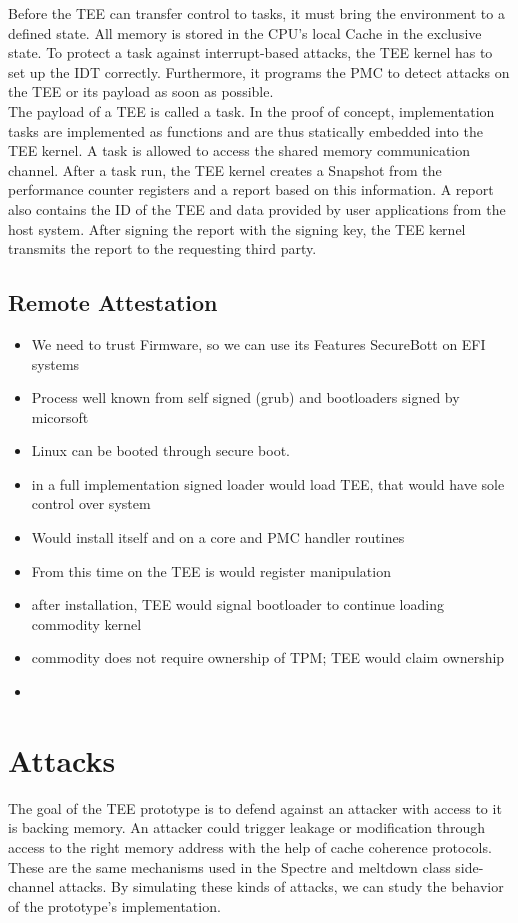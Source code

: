 Before the TEE can transfer control to tasks, it must bring the environment to a
defined state. All memory is stored in the CPU's local Cache in the exclusive
state. To protect a task against interrupt-based attacks, the TEE kernel has to
set up the IDT correctly. Furthermore, it programs the PMC to detect attacks on
the TEE or its payload as soon as possible. \\

The payload of a TEE is called a task. In the proof of concept, implementation
tasks are implemented as functions and are thus statically embedded into the TEE
kernel. A task is allowed to access the shared memory communication channel.
After a task run, the TEE kernel creates a Snapshot from the performance counter
registers and a report based on this information. A report also contains the ID
of the TEE and data provided by user applications from the host system. After
signing the report with the signing key, the TEE kernel transmits the report to
the requesting third party.

\subsection{Remote Attestation}
\begin{itemize}
    \item We need to trust Firmware, so we can use its Features SecureBott on EFI systems
    \item Process well known from self signed (grub) and bootloaders signed by micorsoft
    \item Linux can be booted through secure boot.
    \item in a full implementation signed loader would load TEE, that would have sole control over system
    \item Would install itself and on a core and PMC handler routines
    \item From this time on the TEE is would register manipulation
    \item after installation, TEE would signal bootloader to continue loading commodity kernel
    \item commodity does not require ownership of TPM; TEE would claim ownership
    \item
\end{itemize}


\section{Attacks}
\label{sec:30:attack}
The goal of the TEE prototype is to defend against an attacker with access to it
is backing memory. An attacker could trigger leakage or modification through
access to the right memory address with the help of cache coherence protocols.
These are the same mechanisms used in the Spectre and meltdown class
side-channel attacks. By simulating these kinds of attacks, we can study the
behavior of the prototype's implementation.\\

